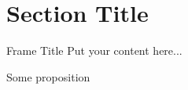 \section{Section Title}

\begin{frame}{Frame Title}
	Put your content here...

\end{frame}

\begin{frame}{}
	\begin{proposition}
		Some proposition
	\end{proposition}

\end{frame}

